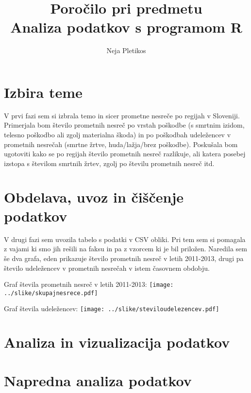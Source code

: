 \documentclass[11pt,a4paper]{article}
\begin{document}
\title{Poročilo pri predmetu \\
Analiza podatkov s programom R}
\author{Neja Pletikos}
\maketitle

\section{Izbira teme}

V prvi fazi sem si izbrala temo in sicer prometne nesreče po regijah v Sloveniji. Primerjala bom število prometnih nesreč po vrstah poškodbe (s smrtnim izidom, telesno poškodbo ali zgolj materialna škoda) in po poškodbah udeležencev v prometnih nesrečah (smrtne žrtve, huda/lažja/brez poškodbe). Poskušala bom ugotoviti kako se po regijah število prometnih nesreč razlikuje, ali katera posebej izstopa s številom smrtnih žrtev, zgolj po številu prometnih nesreč itd.

\section{Obdelava, uvoz in čiščenje podatkov}

V drugi fazi sem uvozila tabelo s podatki v CSV obliki. Pri tem sem si pomagala z vajami ki smo jih rešili na faksu in pa z vzorcem ki je bil priložen. Naredila sem še dva grafa, eden prikazuje število prometnih nesreč v letih 2011-2013, drugi pa število udeležencev v prometnih nesrečah v istem časovnem obdobju.

Graf števila prometnih nesreč v letih 2011-2013:
\texttt{[image: ../slike/skupajnesrece.pdf]}

Graf števila udeležencev:
\texttt{[image: ../slike/steviloudelezencev.pdf]}

\section{Analiza in vizualizacija podatkov}



\section{Napredna analiza podatkov}
\end{document}
